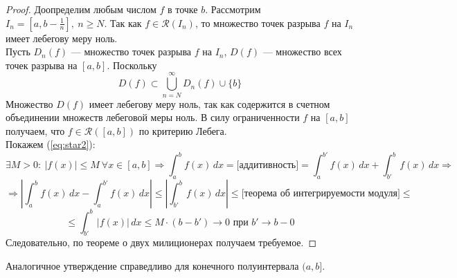 \documentclass[11pt]{article}
\begin{document}
\begin{proof}
    Доопределим любым числом $f$ в точке $b$. Рассмотрим $\displaystyle I_n = 
    \left[a, b - \frac{1}{n}\right], \ n \geq N$. Так как $f \in \mathcal{R}(I_n)$, 
    то множество точек разрыва $f$ на $I_n$ имеет лебегову меру ноль. \\ 
    Пусть $D_n(f)$ --- множество точек разрыва $f$ на $I_n$, $D(f)$ --- множество 
    всех точек разрыва на $[a, b]$. Поскольку 
    \[D(f) \subset \bigcup_{n = N}^{\infty} D_n(f) \cup \{b\}\] 
    Множество $D(f)$ имеет лебегову меру ноль, так как содержится в 
    счетном объединении множеств лебеговой меры ноль. В силу ограниченности $f$ 
    на $[a, b]$ получаем, что $f \in \mathcal{R}([a, b])$ по критерию Лебега.
    \\
    Покажем (\ref{eq:star2}): \[\exists M > 0: \ \left|f(x)\right| \leq M \ \forall
    x \in [a, b] \Longrightarrow \int_{a}^{b}f(x)\,dx = \big[\text{аддитивность}\big]
    = \int_{a}^{b'} f(x)\,dx + \int_{b'}^{b} f(x)\,dx \Longrightarrow\]
    \[\Longrightarrow \left|\int_{a}^{b}f(x)\,dx - \int_{a}^{b'} f(x)\,dx\right| \leq
    \left|\int_{b'}^{b} f(x)\,dx\right| \leq \big[\text{теорема об интегрируемости модуля}\big] \leq\]
    \[\leq \int_{b'}^{b} |f(x)|\,dx \leq M \cdot (b - b') \to 0 \text{ при } b' \to b-0\]
    Следовательно, по теореме о двух милиционерах получаем требуемое.
\end{proof}

\begin{remark}
    Аналогичное утверждение справедливо для конечного полуинтервала $(a, b]$.
\end{remark}
\end{document}

